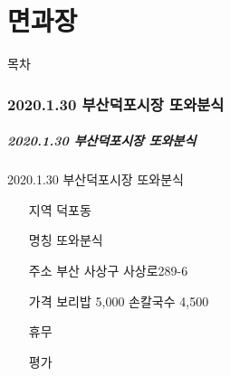 \documentclass[aspectratio=1610,17pt,xcolor=pdftex,dvipsnames,table,handout]{beamer}
\begin{document}
		\part{ 면과장 }
		\frame{\partpage}

		\begin{frame} [plain]{목차}
		\tableofcontents%

\label{part2} 	%

		\end{frame}
		
		\begin{frame} [plain]
		\end{frame}
		\begin{frame} [plain]
		\end{frame}



		\section{2020.1.30 부산덕포시장 또와분식 }								
		\begin{frame} [t,plain]								
		\frametitle{2020.1.30 부산덕포시장 또와분식}								
			\begin{block} {2020.1.30 부산덕포시장 또와분식}							
			\setlength{\leftmargini}{4em}							
			\begin{itemize}							
				\item [지역] 		덕포동				
				\item [명칭] 		또와분식				
				\item [주소]		부산 사상구 사상로289-6				
				\item [가격]		보리밥 5,000 손칼국수 4,500				
				\item [휴무]						
				\item [평가]						
			\end{itemize}							
			\end{block}							
		\end{frame}								
										
\end{document}
